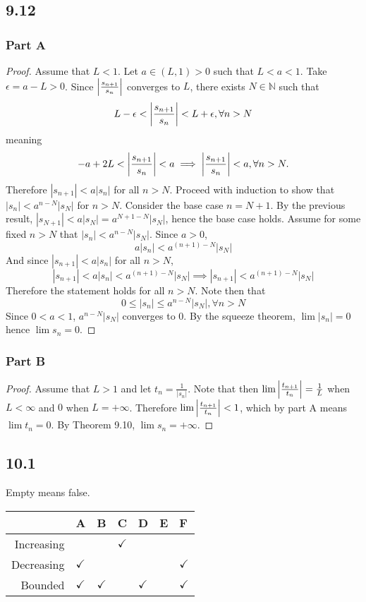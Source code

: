 \documentclass[12pt,titlepage]{extarticle}
\begin{document}
\subsection*{9.12}
\subsubsection*{Part A}
\begin{proof}
    Assume that $L < 1$. Let $a \in (L, 1) > 0$ such that $L < a < 1$. Take $\epsilon = a - L > 0$. Since $\qty|\frac{s_{n+1}}{s_n}|$ converges to $L$, there exists $N \in \mathbb{N}$ such that
    \[
        L - \epsilon < \qty|\frac{s_{n+1}}{s_n}| < L + \epsilon, \forall n > N
    \]
    meaning
    \[
        -a + 2L < \qty|\frac{s_{n+1}}{s_n}| < a \implies \qty|\frac{s_{n+1}}{s_n}| < a, \forall n > N.
    \]
    Therefore $|s_{n+1}| < a |s_n|$ for all $n > N$. Proceed with induction to show that $|s_n| < a^{n - N} |s_N|$ for $n > N$. Consider the base case $n = N + 1$. By the previous result, $|s_{N + 1}| < a |s_N| = a^{N + 1 - N} |s_N|$, hence the base case holds. Assume for some fixed $n > N$ that $|s_n| < a^{n - N} |s_N|$. Since $a > 0$,
    \[
        a|s_n| < a^{(n+1) - N} |s_N|
    \]
    And since $|s_{n+1}| < a |s_n|$ for all $n > N$,
    \[
        |s_{n+1}| < a |s_n| < a^{(n+1) - N} |s_N| \implies |s_{n+1}| < a^{(n+1) - N} |s_N|
    \]
    Therefore the statement holds for all $n > N$. Note then that
    \[
        0 \leq |s_n| \leq a^{n - N} |s_N|, \forall n > N
    \]
    Since $0 < a < 1$, $a^{n-N} |s_N|$ converges to $0$. By the squeeze theorem, $\lim |s_n| = 0$ hence $\lim s_n = 0$.
\end{proof}

\subsubsection*{Part B}
\begin{proof}
    Assume that $L > 1$ and let $t_n = \frac{1}{|s_n|}$. Note that then $\lim\qty|\frac{t_{n+1}}{t_n}| = \frac{1}{L}$ when $L < \infty$ and $0$ when $L = +\infty$. Therefore $\lim\qty|\frac{t_{n+1}}{t_n}| < 1$, which by part A means $\lim t_n = 0$. By Theorem 9.10, $\lim s_n = + \infty$.
\end{proof}

\subsection*{10.1}
Empty means false.
\begin{table}[h!]
    \centering
    \def\arraystretch{1.5}
    \begin{tabular}{r|l|l|l|l|l|l}
     & A & B & C & D & E & F \\\hline
    Increasing &             &              & $\checkmark$ &              &  &              \\\hline
    Decreasing & $\checkmark$ &              &              &              &  & $\checkmark$ \\\hline
    Bounded    & $\checkmark$ & $\checkmark$ &              & $\checkmark$ &  & $\checkmark$
    \end{tabular}
\end{table}
\end{document}

